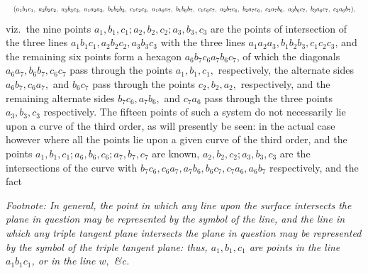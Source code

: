 \documentclass[11pt]{article}
\begin{document}
\[ \resizebox{\textwidth}{!}{$(a_1 b_1 c_1,\ a_2 b_2 c_2,\ a_3 b_3 c_3,\ a_1 a_2 a_3,\ b_1 b_2 b_3,\ c_1 c_2 c_3,\ a_1 a_6 a_7,\ b_1 b_6 b_7,\ c_1 c_6 c_7,\ a_2 b_7 c_6,\ b_2 a_7 c_6,\ c_2 a_7 b_6,\ a_3 b_6 c_7,\ b_3 a_6 c_7,\ c_3 a_6 b_7),$} \] viz.\ the nine points $a_1, b_1, c_1; a_2, b_2, c_2; a_3, b_3, c_3$ are the points of intersection of the three lines $a_1 b_1 c_1, a_2 b_2 c_2, a_3 b_3 c_3$ with the three lines $a_1 a_2 a_3, b_1 b_2 b_3, c_1 c_2 c_3$, and the remaining six points form a hexagon $a_6 b_7 c_6 a_7 b_6 c_7$, of which the diagonals $a_6 a_7, b_6 b_7, c_6 c_7$ pass through the points $a_1, b_1, c_1,$ respectively, the alternate sides $a_6 b_7, c_6 a_7,$ and $b_6 c_7$ pass through the points $c_2, b_2, a_2,$ respectively, and the remaining alternate sides $b_7 c_6, a_7 b_6,$ and $c_7 a_6$ pass through the three points $a_3, b_3, c_3$ respectively. The fifteen points of such a system do not necessarily lie upon a curve of the third order, as will presently be seen: in the actual case however where all the points lie upon a given curve of the third order, and the points $a_1, b_1, c_1; a_6, b_6, c_6; a_7, b_7, c_7$ are known, $a_2, b_2, c_2; a_3, b_3, c_3$ are the intersections of the curve with $b_7 c_6, c_6 a_7, a_7 b_6, b_6 c_7, c_7 a_6, a_6 b_7$ respectively, and the fact

\noindent\textit{Footnote: In general, the point in which any line upon the surface intersects the plane in question may be represented by the symbol of the line, and the line in which any triple tangent plane intersects the plane in question may be represented by the symbol of the triple tangent plane: thus, $a_1, b_1, c_1$ are points in the line $a_1 b_1 c_1$, or in the line $w,$ \&c.}
\end{document}
